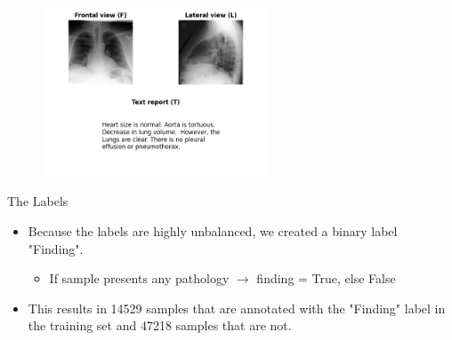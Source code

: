     \begin{frame}
        \begin{figure}
            \centering
            \includegraphics[width=0.6\textwidth]{data/rand_dataset_sample.png}
        \end{figure}

    \end{frame}

    \begin{frame}{The Labels}
        \pause
        \begin{itemize}
            \item Because the labels are highly unbalanced, we created a binary label "Finding".
            \begin{itemize}
                \item If sample presents any pathology $\rightarrow$ finding = True, else False
            \end{itemize}
            \item This results in 14529 samples that are annotated with the "Finding" label in the training set and 47218 samples that are not.
        \end{itemize}
    \end{frame}

